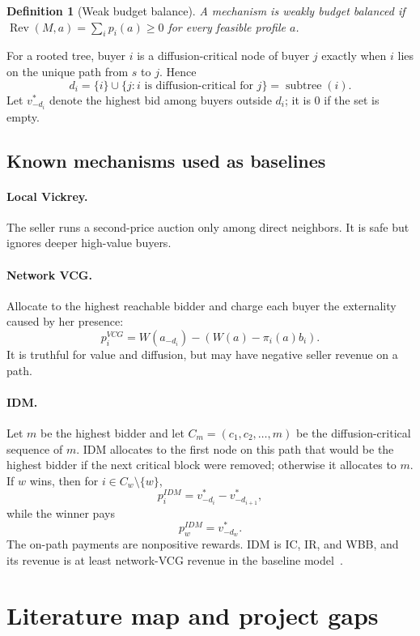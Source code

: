 \documentclass[11pt]{article}
\newtheorem{definition}{Definition}
\newcommand{\Rev}{\operatorname{Rev}}
\newcommand{\subtree}{\operatorname{subtree}}
\begin{document}
\begin{definition}[Weak budget balance]
A mechanism is weakly budget balanced if $\Rev(M,a)=\sum_i p_i(a)\ge 0$ for every feasible profile $a$.
\end{definition}

For a rooted tree, buyer $i$ is a diffusion-critical node of buyer $j$ exactly when $i$ lies on the unique path from $s$ to $j$.  Hence
\[
    d_i=\{i\}\cup\{j: i\text{ is diffusion-critical for }j\}=\subtree(i).
\]
Let $v^*_{-d_i}$ denote the highest bid among buyers outside $d_i$; it is $0$ if the set is empty.

\subsection{Known mechanisms used as baselines}

\paragraph{Local Vickrey.} The seller runs a second-price auction only among direct neighbors.  It is safe but ignores deeper high-value buyers.

\paragraph{Network VCG.} Allocate to the highest reachable bidder and charge each buyer the externality caused by her presence:
\[
    p_i^{VCG}=W(a_{-d_i})-\left(W(a)-\pi_i(a)b_i\right).
\]
It is truthful for value and diffusion, but may have negative seller revenue on a path.

\paragraph{IDM.} Let $m$ be the highest bidder and let $C_m=(c_1,c_2,\ldots,m)$ be the diffusion-critical sequence of $m$.  IDM allocates to the first node on this path that would be the highest bidder if the next critical block were removed; otherwise it allocates to $m$.  If $w$ wins, then for $i\in C_w\setminus\{w\}$,
\[
    p_i^{IDM}=v^*_{-d_i}-v^*_{-d_{i+1}},
\]
while the winner pays
\[
    p_w^{IDM}=v^*_{-d_w}.
\]
The on-path payments are nonpositive rewards.  IDM is IC, IR, and WBB, and its revenue is at least network-VCG revenue in the baseline model~\cite{li2017mdsn}.

\section{Literature map and project gaps}
\end{document}
